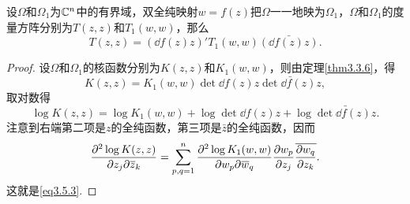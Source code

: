 \begin{theorem}\label{thm3.5.2}
	设$\Omega$和$\Omega_1$为$\mathbb C^n$中的有界域，双全纯映射$w=f(z)$把$\Omega$一一地映为$\Omega_1$，$\Omega$和$\Omega_1$的度量方阵分别为$T(z,z)$和$T_1(w,w)$，那么
	\begin{equation}\label{eq3.5.3}
		T(z,z)=\left(\dd{f(z)}{z}\right)' T_1(w,w)\bar{\left(\dd{f(z)}{z}\right)}.
	\end{equation}
\end{theorem}
\begin{proof}
	设$\Omega$和$\Omega_1$的核函数分别为$K(z,z)$和$K_1(w,w)$，则由定理\ref{thm3.3.6}，得
	\[K(z,z)=K_1(w,w)\det\dd{f(z)}{z}\bar{\det\dd{f(z)}{z}},\]
	取对数得
	\[\log K(z,z)=\log K_1(w,w)+\log\det\dd{f(z)}{z}+\log\bar{\det\dd{f(z)}{z}}.\]
	注意到右端第二项是$z$的全纯函数，第三项是$\bar{z}$的全纯函数，因而
	\[\frac{\partial^2 \log K(z,z)}{\partial z_j\partial {}\mkern1mu\overline{\mkern-1muz}_k}=\sum_{p,q=1}^{n}\frac{\partial^2 \log K_1(w,w)}{\partial w_p\partial {}\mkern1mu\overline{\mkern-1muw}_q}\frac{\partial w_p}{\partial z_j}{}\mkern1mu\overline{\mkern-1mu\frac{\partial w_q}{\partial z_k}}.\]
	这就是\eqref{eq3.5.3}.
\end{proof}
